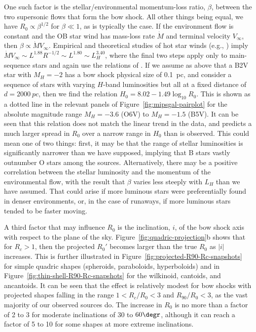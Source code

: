 One such factor is the stellar/environmental momentum-loss ratio,
\(\beta\), between the two supersonic flows that form the bow shock.  All
other things being equal, we have \(R_0 \propto \beta^{1/2}\) for
\(\beta \ll 1\), as is typically the case.  If the environment flow is
constant and the OB star wind has mass-loss rate \(\dot{M}\) and
terminal velocity \(V_\infty\), then
\(\beta \propto \dot{M}{V_\infty}\).  Empirical and theoretical studies of hot star
winds (e.g., \citealp{Puls:1996a}) imply
\(\dot{M}{V_\infty} \sim L^{1.88} R^{-1/2} \sim L^{1.80} \sim L_H^{3.40}\), where
the final two steps apply only to main-sequence stars and again use
the relations of \citet{Eker:2015a}.  If we assume as above that a B2V
star with \(M_H = -2\) has a bow shock physical size of \SI{0.1}{pc},
and consider a sequence of stars with varying \(H\)-band luminosities
but all at a fixed distance of \(d = \SI{2000}{pc}\), then we find the
relation \(H_0 = 8.02 - 1.49 \log_{10} R_0\).  This is shown as a
dotted line in the relevant panels of
Figure~\ref{fig:mipsgal-pairplot} for the absolute magnitude range
\(M_H = -3.6\) (O6V) to \(M_H = -1.5\) (B5V).  It can be seen that
this relation does not match the linear trend in the data, and
predicts a much larger spread in \(R_0\) over a narrow range in
\(H_0\) than is observed.  This could mean one of two things: first,
it may be that the range of stellar luminosities is significantly
narrower than we have supposed, implying that B stars vastly outnumber
O stars among the sources.  Alternatively, there may be a positive
correlation between the stellar luminosity and the momentum of the
environmental flow, with the result that \(\beta\) varies less steeply
with \(L_H\) than we have assumed.  That could arise if more luminous
stars were preferentially found in denser environments, or, in the
case of runaways, if more luminous stars tended to be faster moving.

A third factor that may influence \(R_0\) is the inclination, \(i\),
of the bow shock axis with respect to the plane of the sky.
Figure~\ref{fig:quadric-projection}b shows that for \(R_c > 1\), then
the projected \(R_0'\) becomes larger than the true \(R_0\) as \(|i|\)
increases.  This is further illustrated in
Figure~\ref{fig:projected-R90-Rc-snapshots} for simple quadric shapes
(spheroids, paraboloids, hyperboloids) and in
Figure~\ref{fig:thin-shell-R90-Rc-snapshots} for the wilkinoid,
cantoids, and ancantoids.  It can be seen that the effect is
relatively modest for bow shocks with projected shapes falling in the
range \(1 < R_c/R_0 < 3\) and \(R_{90}/R_0 < 3\), as the vast majority
of our observed sources do.  The increase in \(R_0\) is no more than a
factor of 2 to 3 for moderate inclinations of \(30\) to \(60\degr\),
although it can reach a factor of 5 to 10 for some shapes at more
extreme inclinations.

